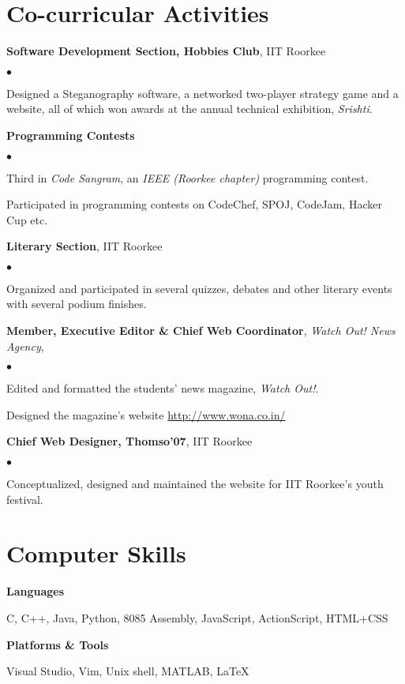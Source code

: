 \documentclass[margin,line]{res}
\newenvironment{list1}{
  \begin{list}{\ding{113}}{%
      \setlength{\itemsep}{0in}
      \setlength{\parsep}{0in} \setlength{\parskip}{0in}
      \setlength{\topsep}{0in} \setlength{\partopsep}{0in} 
      \setlength{\leftmargin}{0.17in}}}{\end{list}}
\newenvironment{list2}{
  \begin{list}{$\bullet$}{%
      \setlength{\itemsep}{0in}
      \setlength{\parsep}{0in} \setlength{\parskip}{0in}
      \setlength{\topsep}{0in} \setlength{\partopsep}{0in} 
      \setlength{\leftmargin}{0.2in}}}{\end{list}}
\begin{document}
\begin{resume}
\section{\sc Co-curricular Activities} 
{\bf Software Development Section, Hobbies Club}, IIT Roorkee
\begin{list2}
\item Designed a Steganography software, a networked two-player strategy game and a website, all of which won awards at the annual  technical exhibition, {\em Srishti}.
\end{list2}
{\bf Programming Contests}
\begin{list2}
\item Third in {\em Code Sangram}, an {\em IEEE (Roorkee chapter)} programming contest.
\item Participated in programming contests on CodeChef, SPOJ, CodeJam, Hacker Cup etc.
\end{list2}
{\bf Literary Section}, IIT Roorkee
\begin{list2}
\item Organized and participated in several quizzes, debates and other literary events with several podium finishes.
\end{list2}
{\bf Member, Executive Editor \& Chief Web Coordinator}, {\em Watch Out! News Agency},
\begin{list2}
\item Edited and formatted the students' news magazine, {\em Watch Out!}.
\item Designed the magazine's website \url{http://www.wona.co.in/}
\end{list2}
{\bf Chief Web Designer, Thomso'07}, IIT Roorkee
\begin{list2}
\item Conceptualized, designed and maintained the website for IIT Roorkee's youth festival.
\end{list2}

\section{\sc Computer Skills} 
{\bf Languages}
\begin{list1}
\item[]  C, C++, Java, Python, 8085 Assembly, JavaScript, ActionScript, HTML+CSS%
\end{list1}
{\bf Platforms \& Tools}
\begin{list1}
\item[] Visual Studio, Vim, Unix shell, MATLAB, \LaTeX{}
\end{list1}

\end{resume}
\end{document}
